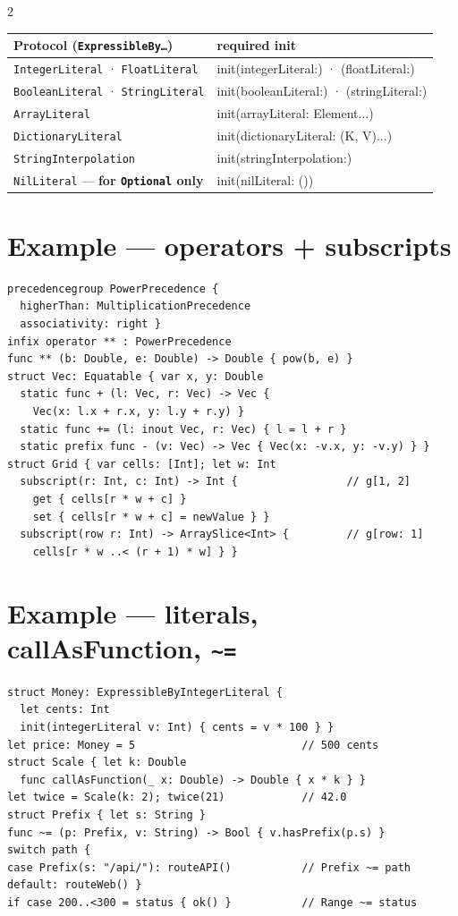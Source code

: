 \documentclass[8pt]{extarticle}
\DeclareRobustCommand\tl{\textasciitilde}
\begin{document}
\begin{multicols}{2}
{\footnotesize
\begin{tabular}{@{}l>{\ttfamily}l@{}}
\toprule
\textbf{Protocol} (\texttt{ExpressibleBy\ldots}) & \textrm{\textbf{required init}} \\
\midrule
\texttt{IntegerLiteral} · \texttt{FloatLiteral} & init(integerLiteral:) · (floatLiteral:) \\
\texttt{BooleanLiteral} · \texttt{StringLiteral} & init(booleanLiteral:) · (stringLiteral:) \\
\texttt{ArrayLiteral} & init(arrayLiteral: Element...) \\
\texttt{DictionaryLiteral} & init(dictionaryLiteral: (K, V)...) \\
\texttt{StringInterpolation} & init(stringInterpolation:) \\
\texttt{NilLiteral} — \textbf{for \texttt{Optional} only} & init(nilLiteral: ()) \\
\bottomrule
\end{tabular}}

\section{Example — operators + subscripts}
\begin{lstlisting}[language=SwiftSheet]
precedencegroup PowerPrecedence {
  higherThan: MultiplicationPrecedence
  associativity: right }
infix operator ** : PowerPrecedence
func ** (b: Double, e: Double) -> Double { pow(b, e) }
struct Vec: Equatable { var x, y: Double
  static func + (l: Vec, r: Vec) -> Vec {
    Vec(x: l.x + r.x, y: l.y + r.y) }
  static func += (l: inout Vec, r: Vec) { l = l + r }
  static prefix func - (v: Vec) -> Vec { Vec(x: -v.x, y: -v.y) } }
struct Grid { var cells: [Int]; let w: Int
  subscript(r: Int, c: Int) -> Int {                 // g[1, 2]
    get { cells[r * w + c] }
    set { cells[r * w + c] = newValue } }
  subscript(row r: Int) -> ArraySlice<Int> {         // g[row: 1]
    cells[r * w ..< (r + 1) * w] } }
\end{lstlisting}

\columnbreak

\section{Example — literals, callAsFunction, \texttt{\hbox{\tl}\hbox{=}}}
\begin{lstlisting}[language=SwiftSheet]
struct Money: ExpressibleByIntegerLiteral {
  let cents: Int
  init(integerLiteral v: Int) { cents = v * 100 } }
let price: Money = 5                          // 500 cents
struct Scale { let k: Double
  func callAsFunction(_ x: Double) -> Double { x * k } }
let twice = Scale(k: 2); twice(21)            // 42.0
struct Prefix { let s: String }
func ~= (p: Prefix, v: String) -> Bool { v.hasPrefix(p.s) }
switch path {
case Prefix(s: "/api/"): routeAPI()           // Prefix ~= path
default: routeWeb() }
if case 200..<300 = status { ok() }           // Range ~= status
\end{lstlisting}


\end{multicols}
\end{document}

